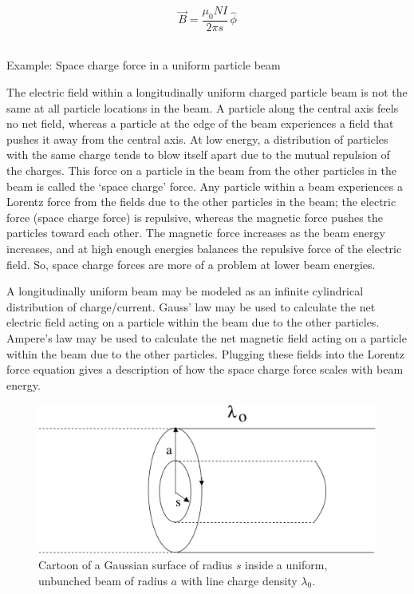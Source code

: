 \documentclass[12pt]{article}
\begin{document}
\begin{flushleft}
\[
\vec{B} = \frac{\mu_{0}NI}{2\pi s} \,\hat{\phi}
\]

\vspace{.2in}
{\color{grey} \hrulefill}\\
{\color{myblue} Example: Space charge force in a uniform particle beam} \\
\vspace{.2in}

The electric field within a longitudinally uniform charged particle beam is not the same at all particle locations in the beam.  A particle along the central axis feels no net field, whereas a particle at the edge of the beam experiences a field that pushes it away from the central axis.  At low energy, a distribution of particles with the same charge tends to blow itself apart due to the mutual repulsion of the charges.  This force on a particle in the beam from the other particles in the beam is called the `space charge' force.  Any particle within a beam experiences a Lorentz force from the fields due to the other particles in the beam; the electric force (space charge force) is repulsive, whereas the magnetic force pushes the particles toward each other.  The magnetic force increases as the beam energy increases, and at high enough energies balances the repulsive force of the electric field.  So, space charge forces are more of a problem at lower beam energies.

A longitudinally uniform beam may be modeled as an infinite cylindrical distribution of charge/current.  Gauss' law may be used to calculate the net electric field acting on a particle within the beam due to the other particles.   Ampere's law may be used to calculate the net magnetic field acting on a particle within the beam due to the other particles.  Plugging these fields into the Lorentz force equation gives a description of how the space charge force scales with beam energy.

\begin{figure}[h]
\centering
\includegraphics*[trim=0cm 0cm 0cm 0cm, clip=true, width=0.6\columnwidth]{glaw_beam.pdf}
\caption{Cartoon of a Gaussian surface of radius $s$ inside a uniform, unbunched beam of radius $a$ with line charge density $\lambda_{0}$.}
\label{fig:gauss}
\end{figure}


\end{flushleft}
\end{document}
